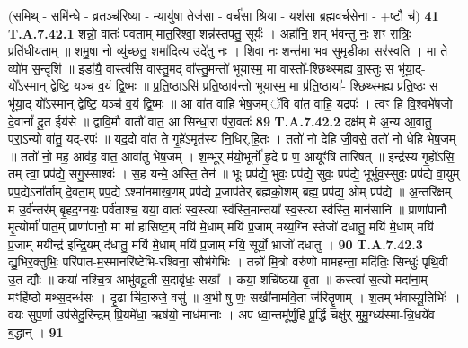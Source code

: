 \documentclass[17pt]{extarticle}
\begin{document}
{                  \newline
                                                        (स॒मिथ् - समि॑न्धे - व्र॒तञ्च॑रिष्या॒ - म्यायु॑षा॒ तेज॑सा॒ - वर्च॑सा श्रि॒या - यश॑सा ब्रह्मवर्च॒सेना॒ - +ष्टौ च॑) \textbf{41} \newline \newline
                                \textbf{ T.A.7.42.1} \newline
                  शन्नो॒ वातः॑ पवताम् मात॒रिश्वा॒ शन्न॑स्तपतु॒ सूर्यः॑ । अहा॑नि॒ शम् भ॑वन्तु नः॒ शꣳ रात्रिः॒ प्रति॑धीयताम् ॥ शमु॒षा नो॒ व्यु॑च्छतु॒ शमा॑दि॒त्य उदे॑तु नः । शि॒वा नः॒ शन्त॑मा भव सुमृडी॒का सर॑स्वति । मा ते॒ व्यो॑म स॒न्दृशि॑ ॥  इडा॑यै॒ वास्त्व॑सि वास्तु॒मद् वा᳚स्तु॒मन्तो॑ भूयास्म॒ मा वास्तो᳚-श्छिथ्स्मह्य वा॒स्तुः स भू॑या॒द्-यो᳚ऽस्मान् द्वेष्टि॒ यञ्च॑ व॒यं द्वि॒ष्मः ॥  प्र॒ति॒ष्ठाऽसि॑ प्रति॒ष्ठाव॑न्तो भूयास्म॒ मा प्र॑ति॒ष्ठाया᳚- श्छिथ्स्मह्य प्रति॒ष्ठः  स भू॑या॒द् यो᳚ऽस्मान् द्वेष्टि॒ यञ्च॑ व॒यं द्वि॒ष्मः ॥ आ वा॑त वाहि भेष॒जम् ॅवि वा॑त वाहि॒ यद्रपः॑ ।  त्वꣳ हि वि॒श्वभे॑षजो दे॒वानां᳚ दू॒त ईय॑से ॥  द्वावि॒मौ वातौ॑ वात॒ आ सिन्धा॒रा प॑रा॒वतः॑ \textbf{ 89} \newline
                  \newline
                                                                  \textbf{ T.A.7.42.2} \newline
                  दक्ष॑म् मे अ॒न्य आ॒वातु॒ परा॒ऽन्यो वा॑तु॒ यद्-रपः॑ ॥  यद॒दो वा॑त ते गृ॒हे॑ऽमृत॑स्य नि॒धिर्.हि॒तः ।  ततो॑ नो देहि जी॒वसे॒ ततो॑ नो धेहि भेष॒जम् ॥  ततो॑ नो॒ मह॒ आव॑ह॒ वात॒ आवा॑तु भेष॒जम् ।  श॒म्भूर् म॑यो॒भूर्नो॑ हृ॒दे प्र ण॒ आयूꣳ॑षि तारिषत् ॥ इन्द्र॑स्य गृ॒हो॑ऽसि॒ तम् त्वा॒ प्रप॑द्ये॒ सगु॒स्साश्वः॑ । स॒ह यन्मे॒ अस्ति॒ तेन॑ ॥  भूः प्रप॑द्ये॒ भुवः॒ प्रप॑द्ये॒ सुवः॒ प्रप॑द्ये॒ भूर्भुव॒स्सुवः॒ प्रप॑द्ये वा॒युम्  प्रप॒द्येऽना᳚र्ताम् दे॒वता॒म् प्रप॒द्ये ऽश्मा॑नमाख॒णम् प्रप॑द्ये प्र॒जाप॑तेर्  ब्रह्मको॒शम् ब्रह्म॒ प्रप॑द्य॒ ओम् प्रप॑द्ये ॥  अ॒न्तरि॑क्षम् म उ॒र्व॑न्तर॑म् बृ॒हद॒ग्नयः॒ पर्व॑ताश्च॒ यया॒ वातः॑ स्व॒स्त्या स्व॑स्ति॒मान्तया᳚ स्व॒स्त्या स्व॑स्ति॒ मान॑सानि ॥  प्राणा॑पानौ मृ॒त्योर्मा॑ पात॒म् प्राणा॑पानौ॒ मा मा॑ हासिष्ट॒म् मयि॑ मे॒धाम् मयि॑ प्र॒जाम् मय्य॒ग्नि स्तेजो॑ दधातु॒ मयि॑ मे॒धाम् मयि॑ प्र॒जाम् मयीन्द्र॑ इन्द्रि॒यम् द॑धातु॒ मयि॑ मे॒धाम् मयि॑ प्र॒जाम् मयि॒ सूर्यो॒  भ्राजो॑ दधातु । \textbf{ 90} \newline
                  \newline
                                                                  \textbf{ T.A.7.42.3} \newline
                  द्यु॒भिर॒क्तुभिः॒ परि॑पात-म॒स्मानरि॑ष्टेभि-रश्विना॒ सौभ॑गेभिः । तन्नो॑ मि॒त्रो वरु॑णो मामहन्ता॒ मदि॑तिः॒ सिन्धुः॑ पृथि॒वी उ॒त द्यौः ॥  कया॑ नश्चि॒त्र आभु॑वदू॒ती स॒दावृ॑धः॒ सखा᳚ । कया॒ शचि॑ष्ठया वृ॒ता ॥ कस्त्वा॑ स॒त्यो मदा॑ना॒म् मꣳहि॑ष्ठो मथ्स॒दन्ध॑सः ।  दृ॒ढा चि॑दा॒रुजे॒ वसु॑ ॥ अ॒भी षु णः॒ सखी॑नामवि॒ता ज॑रितॄ॒णाम् । श॒तम् भ॑वास्यू॒तिभिः॑ ॥  वयः॑ सुप॒र्णा उप॑सेदु॒रिन्द्र॑म् प्रि॒यमे॑धा॒ ऋष॑यो॒ नाध॑मानाः ।  अप॑ ध्वा॒न्तमू᳚र्णु॒हि पू॒र्द्धि चक्षु॑र् मुमु॒ग्ध्य॑स्मा-न्नि॒धये॑व ब॒द्धान् । \textbf{ 91} \newline
}
\end{document}
